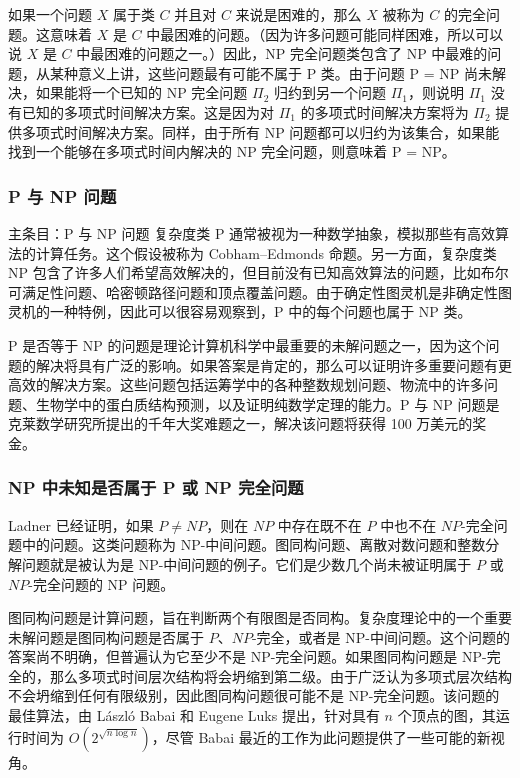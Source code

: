 如果一个问题 \( X \) 属于类 \( C \) 并且对 \( C \) 来说是困难的，那么 \( X \) 被称为 \( C \) 的完全问题。这意味着 \( X \) 是 \( C \) 中最困难的问题。（因为许多问题可能同样困难，所以可以说 \( X \) 是 \( C \) 中最困难的问题之一。）因此，NP 完全问题类包含了 NP 中最难的问题，从某种意义上讲，这些问题最有可能不属于 P 类。由于问题 P = NP 尚未解决，如果能将一个已知的 NP 完全问题 \( \Pi_2 \) 归约到另一个问题 \( \Pi_1 \)，则说明 \( \Pi_1 \) 没有已知的多项式时间解决方案。这是因为对 \( \Pi_1 \) 的多项式时间解决方案将为 \( \Pi_2 \) 提供多项式时间解决方案。同样，由于所有 NP 问题都可以归约为该集合，如果能找到一个能够在多项式时间内解决的 NP 完全问题，则意味着 P = NP。


\subsubsection{P 与 NP 问题}  
主条目：P 与 NP 问题  
复杂度类 P 通常被视为一种数学抽象，模拟那些有高效算法的计算任务。这个假设被称为 Cobham–Edmonds 命题。另一方面，复杂度类 NP 包含了许多人们希望高效解决的，但目前没有已知高效算法的问题，比如布尔可满足性问题、哈密顿路径问题和顶点覆盖问题。由于确定性图灵机是非确定性图灵机的一种特例，因此可以很容易观察到，P 中的每个问题也属于 NP 类。

P 是否等于 NP 的问题是理论计算机科学中最重要的未解问题之一，因为这个问题的解决将具有广泛的影响。如果答案是肯定的，那么可以证明许多重要问题有更高效的解决方案。这些问题包括运筹学中的各种整数规划问题、物流中的许多问题、生物学中的蛋白质结构预测，以及证明纯数学定理的能力。P 与 NP 问题是克莱数学研究所提出的千年大奖难题之一，解决该问题将获得 100 万美元的奖金。
\subsubsection{NP 中未知是否属于 P 或 NP 完全问题} 
Ladner 已经证明，如果 \( P \neq NP \)，则在 \( NP \) 中存在既不在 \( P \) 中也不在 \( NP \)-完全问题中的问题。这类问题称为 NP-中间问题。图同构问题、离散对数问题和整数分解问题就是被认为是 NP-中间问题的例子。它们是少数几个尚未被证明属于 \( P \) 或 \( NP \)-完全问题的 NP 问题。

图同构问题是计算问题，旨在判断两个有限图是否同构。复杂度理论中的一个重要未解问题是图同构问题是否属于 \( P \)、\( NP \)-完全，或者是 NP-中间问题。这个问题的答案尚不明确，但普遍认为它至少不是 NP-完全问题。如果图同构问题是 NP-完全的，那么多项式时间层次结构将会坍缩到第二级。由于广泛认为多项式层次结构不会坍缩到任何有限级别，因此图同构问题很可能不是 NP-完全问题。该问题的最佳算法，由 László Babai 和 Eugene Luks 提出，针对具有 \( n \) 个顶点的图，其运行时间为 \( O(2^{\sqrt{n \log n}}) \)，尽管 Babai 最近的工作为此问题提供了一些可能的新视角。


